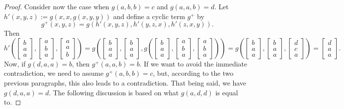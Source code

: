 \documentclass[10pt,a4paper]{amsart}
\begin{document}
\begin{proof}
Consider now the case when $g(a,b,b)=c$ and $g(a,a,b)=d$. Let $h'(x,y,z):=g(x,x,g(x,y,y))$ and define a cyclic term $g^+$ by $$g^+(x,y,z)=g(h'(x,y,z),h'(y,z,x),h'(z,x,y)).$$ Then 
\begin{equation*}
h'\left(
\begin{bmatrix}
b \\
a \\
a
\end{bmatrix}\!,\!
\begin{bmatrix}
a \\
b \\
a
\end{bmatrix}\!,\!
\begin{bmatrix}
a \\
a \\
b
\end{bmatrix}
\right)=
g\left(
\begin{bmatrix}
b \\
a \\
a
\end{bmatrix}\!,\!
\begin{bmatrix}
b \\
a \\
a
\end{bmatrix}\!,\!
g\left(
\begin{bmatrix}
b \\
a \\
a
\end{bmatrix}\!,\!
\begin{bmatrix}
a \\
b \\
a
\end{bmatrix}\!,\!
\begin{bmatrix}
a \\
b \\
a
\end{bmatrix}
\right)
\right)=
g\left(
\begin{bmatrix}
b \\
a \\
a
\end{bmatrix}\!,\!
\begin{bmatrix}
b \\
a \\
a
\end{bmatrix}\!,\!
\begin{bmatrix}
d \\
c \\
a
\end{bmatrix}
\right)=
\begin{bmatrix}
d \\
a\\
a
\end{bmatrix}.
\end{equation*}
Now, if $g(d,a,a)=b$, then $g^+(a,a,b)=b$. If we want to avoid the immediate contradiction, we need to assume $g^+(a,b,b)=c$, but, according to the two previous paragraphs, this also leads to a contradiction. That being said, we have $g(d,a,a)=d$. The following discussion is based on what $g(a,d,d)$ is equal to. 


\end{proof}
\end{document}
